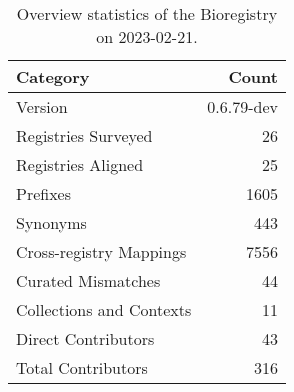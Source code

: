 \begin{table}
\centering
\caption{Overview statistics of the Bioregistry on 2023-02-21.}
\label{tab:bioregistry-summary}
\begin{tabular}{lr}
\toprule
                Category &      Count \\
\midrule
                 Version & 0.6.79-dev \\
     Registries Surveyed &         26 \\
      Registries Aligned &         25 \\
                Prefixes &       1605 \\
                Synonyms &        443 \\
 Cross-registry Mappings &       7556 \\
      Curated Mismatches &         44 \\
Collections and Contexts &         11 \\
     Direct Contributors &         43 \\
      Total Contributors &        316 \\
\bottomrule
\end{tabular}
\end{table}
